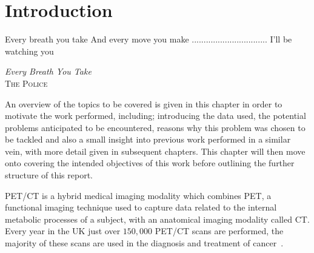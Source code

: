 \chapter{Introduction} \label{sec:introduction}
    \vspace*{\fill}
    \setlength{\epigraphwidth}{0.3\linewidth}
    \renewcommand{\epigraphflush}{flushright}
    \renewcommand{\epigraphsize}{\footnotesize}
    \epigraph{Every breath you take\newline
              And every move you make\newline
              ................................\newline
              I'll be watching you}%
              {\textit{Every Breath You Take}\\ \textsc{The Police}}
    
    \newpage
    
        An overview of the topics to be covered is given in this chapter in order to motivate the work performed, including; introducing the data used, the potential problems anticipated to be encountered, reasons why this problem was chosen to be tackled and also a small insight into previous work performed in a similar vein, with more detail given in subsequent chapters. This chapter will then move onto covering the intended objectives of this work before outlining the further structure of this report.
    
        \gls{PET}/\gls{CT} is a hybrid medical imaging modality which combines \gls{PET}, a functional imaging technique used to capture data related to the internal metabolic processes of a subject, with an anatomical imaging modality called \gls{CT}. Every year in the UK just over $150,000$ \gls{PET}/\gls{CT} scans are performed, the majority of these scans are used in the diagnosis and treatment of cancer~\parencite{NHSEngland2020Diagnostic2019/20}.
    
